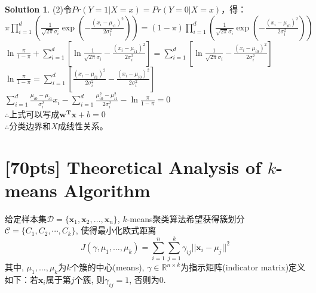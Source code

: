 \documentclass[a4paper,UTF8]{article}
\numberwithin{equation}{section}
\theoremstyle{definition}
\newtheorem*{solution}{Solution}
\begin{document}
\begin{solution}
(2)令$Pr(Y=1|X=x) = Pr(Y=0|X=x)$，得：\\
$\pi \prod_{i=1}^d (\frac{1}{\sqrt{2\pi}\sigma_i} \exp(-\frac{(x_i-\mu_{i1})^2}{2\sigma_i^2})) = (1-\pi) \prod_{i=1}^d (\frac{1}{\sqrt{2\pi}\sigma_i} \exp(-\frac{(x_i-\mu_{i0})^2}{2\sigma_i^2}))$\\
$\ln \frac{\pi}{1-\pi} + \sum_{i=1}^d [\ln\frac{1}{\sqrt{2\pi}\sigma_i} - \frac{(x_i - \mu_{i1})^2}{2\sigma_i^2}] = \sum_{i=1}^d [\ln\frac{1}{\sqrt{2\pi}\sigma_i} - \frac{(x_i - \mu_{i0})^2}{2\sigma_i^2}]$\\
$\ln \frac{\pi}{1-\pi} = \sum_{i=1}^d [ \frac{(x_i - \mu_{i1})^2}{2\sigma_i^2} - \frac{(x_i - \mu_{i0})^2}{2\sigma_i^2} ]$\\
$\sum_{i=1}^d \frac{\mu_{i0}-\mu_{i1}}{\sigma_i^2} x_i - \sum_{i=1}^d \frac{\mu_{i0}^2-\mu_{i1}^2}{2\sigma_i^2} - \ln\frac{\pi}{1-\pi}=0$\\
$\therefore$上式可以写成$\mathbf{w^T}\mathbf{x} + b = 0$\\
$\therefore$分类边界和$X$成线性关系。
\end{solution}



\newpage
\section{[70pts] Theoretical Analysis of $k$-means Algorithm}
给定样本集$\mathcal{D} = \{ \mathbf x_1,\mathbf x_2, \ldots, \mathbf x_n \}$, $k$-means聚类算法希望获得簇划分$\mathcal{C}=\{C_1,C_2,\cdots,C_k\}$, 使得最小化欧式距离
\begin{equation}
\label{eq-kmeans-l2}
J(\gamma, \mu_1,\ldots,\mu_k) = \sum_{i=1}^n \sum_{j=1}^k \gamma_{ij}||\mathbf x_i - \mu_j||^2
\end{equation} 
其中, $\mu_1, \ldots, \mu_k$为$k$个簇的中心(means), $\gamma \in \mathbb{R}^{n\times k}$为指示矩阵(indicator matrix)定义如下：若$\mathbf x_i$属于第$j$个簇, 则$\gamma_{ij} = 1$, 否则为0. 
\end{document}
